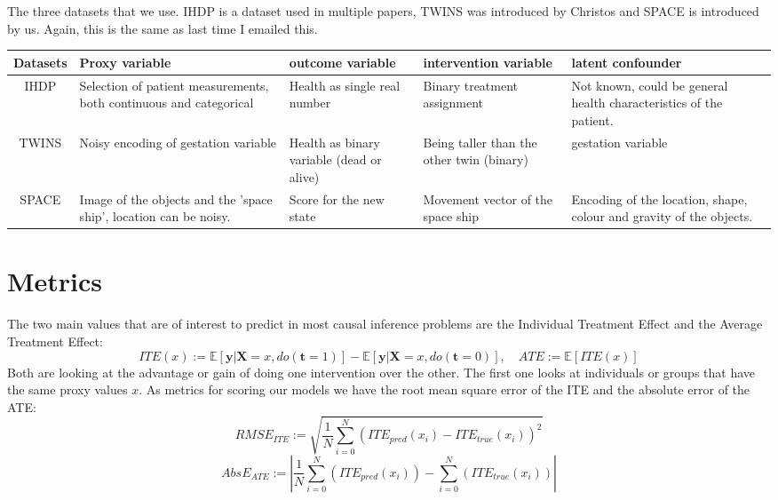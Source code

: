 \documentclass{article}
\newcommand{\E}{\mathbb{E}}
\newcommand{\bt}{\mathbf{t}}
\newcommand{\bX}{\mathbf{X}}
\newcommand{\by}{\mathbf{y}}
\begin{document}
The three datasets that we use. IHDP is a dataset used in multiple papers, TWINS was introduced by Christos and SPACE is introduced by us. Again, this is the same as last time I emailed this.

\begin{table}[h]
    \centering
    \begin{tabular}{c|p{4cm}|p{3.5cm}|p{3.5cm}|p{4cm}}
        Datasets & Proxy variable & outcome variable & intervention variable & latent confounder \\
        \hline
        IHDP & Selection of patient measurements, both continuous and categorical & Health as single real number & Binary treatment assignment & Not known, could be general health characteristics of the patient.\\
        \hline
        TWINS & Noisy encoding of gestation variable & Health as binary variable (dead or alive) & Being taller than the other twin (binary) & gestation variable \\ 
        \hline
        SPACE & Image of the objects and the 'space ship', location can be noisy.  & Score for the new state & Movement vector of the space ship & Encoding of the location, shape, colour and gravity of the objects.\\
    \end{tabular}
    \label{tab:my_label}
\end{table}

\newpage

\section*{Metrics}
The two main values that are of interest to predict in most causal inference problems are the Individual Treatment Effect and the Average Treatment Effect:
\begin{equation}
    ITE(x) := \E[\by | \bX=x, do(\bt=1)] - \E[\by | \bX=x, do(\bt=0)], \quad ATE := \E[ITE(x)]
\end{equation}
Both are looking at the advantage or gain of doing one intervention over the other. The first one looks at individuals or groups that have the same proxy values $x$. As metrics for scoring our models we have the root mean square error of the ITE and the absolute error of the ATE: 
\begin{equation}
    RMSE_{ITE} :=\sqrt{\frac{1}{N} \sum\limits^N_{i=0} (ITE_{pred}(x_i) - ITE_{true}(x_i))^2}
\end{equation}
\begin{equation}
    AbsE_{ATE} := \left| \frac{1}{N} \sum\limits^N_{i=0} (ITE_{pred}(x_i)) - \sum\limits^N_{i=0} (ITE_{true}(x_i)) \right|
\end{equation}
\end{document}
